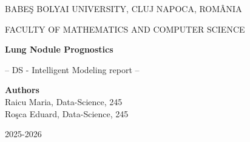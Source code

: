 \documentclass[runningheads,a4paper,11pt]{report}
\begin{document}
\begin{titlepage}
\sloppy
\begin{center}
BABE\c S BOLYAI UNIVERSITY, CLUJ NAPOCA, ROM\^ ANIA

FACULTY OF MATHEMATICS AND COMPUTER SCIENCE

\vspace{6cm}

\Huge \textbf{Lung Nodule Prognostics}

\vspace{1cm}

\normalsize -- DS - Intelligent Modeling report --

\end{center}

\vspace{5cm}

\begin{flushright}
\Large{\textbf{Authors}}\\
Raicu Maria, Data-Science, 245 \\
Ro\c sca Eduard, Data-Science, 245 \\
\end{flushright}
\vspace{4cm}
\begin{center}
2025-2026
\end{center}
\end{titlepage}











\tableofcontents
\newpage
\newpage
{}
\newpage
{}


















\end{document}
